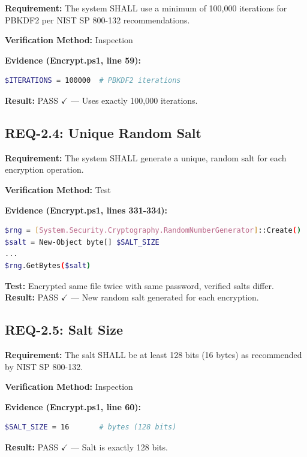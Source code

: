 \documentclass[11pt,letterpaper]{article}
\begin{document}
\textbf{Requirement:} The system SHALL use a minimum of 100,000 iterations for PBKDF2 per NIST SP 800-132 recommendations.

\textbf{Verification Method:} Inspection

\begin{samepage}
\textbf{Evidence (Encrypt.ps1, line 59):}
\begin{lstlisting}[language=bash]
$ITERATIONS = 100000  # PBKDF2 iterations
\end{lstlisting}
\textbf{Result:} PASS $\checkmark$ --- Uses exactly 100,000 iterations.
\end{samepage}

\subsection{REQ-2.4: Unique Random Salt}

\textbf{Requirement:} The system SHALL generate a unique, random salt for each encryption operation.

\textbf{Verification Method:} Test

\begin{samepage}
\textbf{Evidence (Encrypt.ps1, lines 331-334):}
\begin{lstlisting}[language=bash]
$rng = [System.Security.Cryptography.RandomNumberGenerator]::Create()
$salt = New-Object byte[] $SALT_SIZE
...
$rng.GetBytes($salt)
\end{lstlisting}
\textbf{Test:} Encrypted same file twice with same password, verified salts differ.\\
\textbf{Result:} PASS $\checkmark$ --- New random salt generated for each encryption.
\end{samepage}

\subsection{REQ-2.5: Salt Size}

\textbf{Requirement:} The salt SHALL be at least 128 bits (16 bytes) as recommended by NIST SP 800-132.

\textbf{Verification Method:} Inspection

\begin{samepage}
\textbf{Evidence (Encrypt.ps1, line 60):}
\begin{lstlisting}[language=bash]
$SALT_SIZE = 16       # bytes (128 bits)
\end{lstlisting}
\textbf{Result:} PASS $\checkmark$ --- Salt is exactly 128 bits.
\end{samepage}
\end{document}
